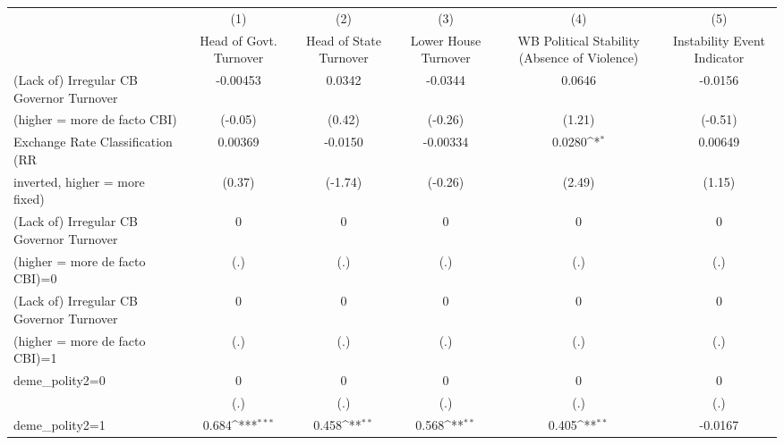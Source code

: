 {
\def\sym#1{\ifmmode^{#1}\else\(^{#1}\)\fi}
\begin{tabular}{l*{5}{c}}
\toprule
                                        &\multicolumn{1}{c}{(1)}&\multicolumn{1}{c}{(2)}&\multicolumn{1}{c}{(3)}&\multicolumn{1}{c}{(4)}&\multicolumn{1}{c}{(5)}\\
                                        &\multicolumn{1}{c}{Head of Govt. Turnover}&\multicolumn{1}{c}{Head of State Turnover}&\multicolumn{1}{c}{Lower House Turnover}&\multicolumn{1}{c}{WB Political Stability (Absence of Violence)}&\multicolumn{1}{c}{Instability Event Indicator}\\
\midrule
(Lack of) Irregular CB Governor Turnover& -0.00453         &   0.0342         &  -0.0344         &   0.0646         &  -0.0156         \\
(higher = more de facto CBI)            &  (-0.05)         &   (0.42)         &  (-0.26)         &   (1.21)         &  (-0.51)         \\
\addlinespace
Exchange Rate Classification (RR        &  0.00369         &  -0.0150         & -0.00334         &   0.0280\sym{*}  &  0.00649         \\
inverted, higher = more fixed)          &   (0.37)         &  (-1.74)         &  (-0.26)         &   (2.49)         &   (1.15)         \\
\addlinespace
(Lack of) Irregular CB Governor Turnover&        0         &        0         &        0         &        0         &        0         \\
(higher = more de facto CBI)=0          &      (.)         &      (.)         &      (.)         &      (.)         &      (.)         \\
\addlinespace
(Lack of) Irregular CB Governor Turnover&        0         &        0         &        0         &        0         &        0         \\
(higher = more de facto CBI)=1          &      (.)         &      (.)         &      (.)         &      (.)         &      (.)         \\
\addlinespace
deme\_polity2=0                          &        0         &        0         &        0         &        0         &        0         \\
                                        &      (.)         &      (.)         &      (.)         &      (.)         &      (.)         \\
\addlinespace
deme\_polity2=1                          &    0.684\sym{***}&    0.458\sym{**} &    0.568\sym{**} &    0.405\sym{**} &  -0.0167         \\

\end{tabular}}
